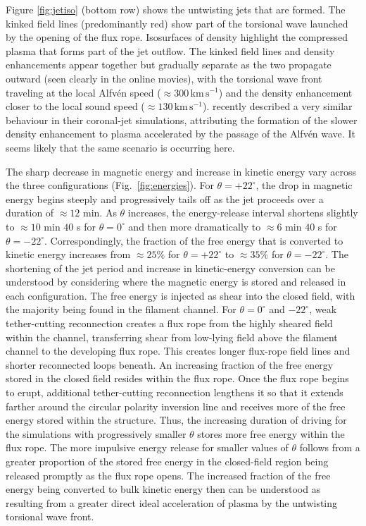 \documentclass[twocolumn]{aastex6}
\begin{document}
Figure \ref{fig:jetiso} (bottom row) shows the untwisting jets that are formed. The kinked field lines (predominantly red) show part of the torsional wave launched by the opening of the flux rope. Isosurfaces of density highlight the compressed plasma that forms part of the jet outflow. The kinked field lines and density enhancements appear together but gradually separate as the two propagate outward (seen clearly in the online movies), with the torsional wave front traveling at the local Alfv\'{e}n speed ($\approx 300 \,\text{km}\,\text{s}^{-1}$) and the density enhancement closer to the local sound speed ($\approx 130 \,\text{km}\,\text{s}^{-1}$). \citet{Pariat2016} recently described a very similar behaviour in their coronal-jet simulations, attributing the formation of the slower density enhancement to plasma accelerated by the passage of the Alfv\'{e}n wave. It seems likely that the same scenario is occurring here.  

The sharp decrease in magnetic energy and increase in kinetic energy vary across the three configurations (Fig.\ \ref{fig:energies}). For $\theta = +22^\circ$, the drop in magnetic energy begins steeply and progressively tails off as the jet proceeds over a duration of $\approx 12$ min. As $\theta$ increases, the energy-release interval shortens slightly to $\approx 10$ min $40$ s for $\theta = 0^\circ$ and then more dramatically to $\approx 6$ min $40$ s for $\theta = -22^\circ$. Correspondingly, the fraction of the free energy that is converted to kinetic energy increases from $\approx 25\%$ for $\theta = +22^\circ$ to $\approx 35\%$ for $\theta = -22^\circ$. The shortening of the jet period and increase in kinetic-energy conversion can be understood by considering where the magnetic energy is stored and released in each configuration. The free energy is injected as shear into the closed field, with the majority being found in the filament channel. For $\theta = 0^\circ$ and $-22^\circ$, weak tether-cutting reconnection creates a flux rope from the highly sheared field within the channel, transferring shear from low-lying field above the filament channel to the developing flux rope. This creates longer flux-rope field lines and shorter reconnected loops beneath. An increasing fraction of the free energy stored in the closed field resides within the flux rope. Once the flux rope begins to erupt, additional tether-cutting reconnection lengthens it so that it extends farther around the circular polarity inversion line and receives more of the free energy stored within the structure. Thus, the increasing duration of driving for the simulations with progressively smaller $\theta$ stores more free energy within the flux rope. The more impulsive energy release for smaller values of $\theta$ follows from a greater proportion of the stored free energy in the closed-field region being released promptly as the flux rope opens. The increased fraction of the free energy being converted to bulk kinetic energy then can be understood as resulting from a greater direct ideal acceleration of plasma by the untwisting torsional wave front. 
\end{document}
